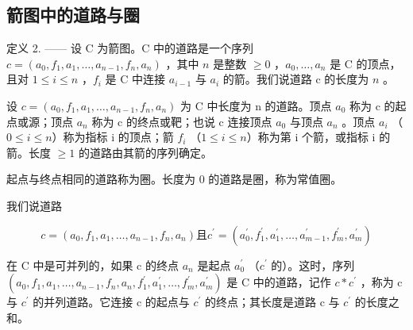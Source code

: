 \subsection{箭图中的道路与圈}

定义 2. —— 设 C 为箭图。C 中的道路是一个序列 \(c = (a_{0}, f_{1}, a_{1}, \ldots, a_{n-1}, f_{n}, a_{n})\) ，其中 \(n\) 是整数 \(\geqslant 0\) ，\(a_{0}, \ldots, a_{n}\) 是 C 的顶点，且对 \(1 \leqslant i \leqslant n\) ，\(f_{i}\) 是 C 中连接 \(a_{i-1}\) 与 \(a_{i}\) 的箭。我们说道路 c 的长度为 \(n\) 。

设 \(c = (a_{0}, f_{1}, a_{1}, \ldots, a_{n-1}, f_{n}, a_{n})\) 为 C 中长度为 n 的道路。顶点 \(a_{0}\) 称为 c 的起点或源；顶点 \(a_{n}\) 称为 c 的终点或靶；也说 c 连接顶点 \(a_{0}\) 与顶点 \(a_{n}\) 。顶点 \(a_{i}\) （\(0 \leqslant i \leqslant n\)）称为指标 i 的顶点；箭 \(f_{i}\) （\(1 \leqslant i \leqslant n\)）称为第 i 个箭，或指标 i 的箭。长度 \(\geqslant 1\) 的道路由其箭的序列确定。

起点与终点相同的道路称为圈。长度为 0 的道路是圈，称为常值圈。

我们说道路

\[
c = (a _ {0}, f _ {1}, a _ {1}, \ldots , a _ {n - 1}, f _ {n}, a _ {n}) \text{且} c ^ {\prime} = (a _ {0} ^ {\prime}, f _ {1} ^ {\prime}, a _ {1} ^ {\prime}, \ldots , a _ {m - 1} ^ {\prime}, f _ {m} ^ {\prime}, a _ {m} ^ {\prime})
\]

在 C 中是可并列的，如果 c 的终点 \(a_{n}\) 是起点 \(a_{0}^{\prime}\) （\(c^{\prime}\) 的）。这时，序列 \((a_{0}, f_{1}, a_{1}, \ldots, a_{n-1}, f_{n}, a_{n}, f_{1}^{\prime}, a_{1}^{\prime}, \ldots, f_{m}^{\prime}, a_{m}^{\prime})\) 是 C 中的道路，记作 \(c * c^{\prime}\) ，称为 c 与 \(c^{\prime}\) 的并列道路。它连接 c 的起点与 \(c^{\prime}\) 的终点；其长度是道路 c 与 \(c^{\prime}\) 的长度之和。

